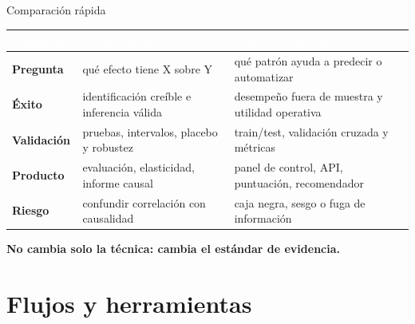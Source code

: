 \documentclass[aspectratio=169,11pt,table]{beamer}
\begin{document}
\begin{frame}{Comparación rápida}
\vfill
\renewcommand{\arraystretch}{1.45}
\footnotesize
\begin{center}
\begin{tabular}{l l l}
\toprule
\rowcolor{ccdenavy}
\textcolor{white}{\textbf{Dimensión}} & \textcolor{white}{\textbf{Econometría}} & \textcolor{white}{\textbf{Ciencia de datos}} \\
\midrule
\textbf{Pregunta} & \parbox[c]{5.6cm}{qué efecto tiene X sobre Y} & \parbox[c]{5.6cm}{qué patrón ayuda a predecir o automatizar} \\
\textbf{Éxito} & \parbox[c]{5.6cm}{identificación creíble e inferencia válida} & \parbox[c]{5.6cm}{desempeño fuera de muestra y utilidad operativa} \\
\textbf{Validación} & \parbox[c]{5.6cm}{pruebas, intervalos, placebo y robustez} & \parbox[c]{5.6cm}{train/test, validación cruzada y métricas} \\
\textbf{Producto} & \parbox[c]{5.6cm}{evaluación, elasticidad, informe causal} & \parbox[c]{5.6cm}{panel de control, API, puntuación, recomendador} \\
\textbf{Riesgo} & \parbox[c]{5.6cm}{confundir correlación con causalidad} & \parbox[c]{5.6cm}{caja negra, sesgo o fuga de información} \\
\bottomrule
\end{tabular}
\end{center}

\vspace{0.35cm}
\centering
{\footnotesize\bfseries\textcolor{ccdeblue}{No cambia solo la técnica: cambia el estándar de evidencia.}}
\vfill
\end{frame}

\section{Flujos y herramientas}
\end{document}
